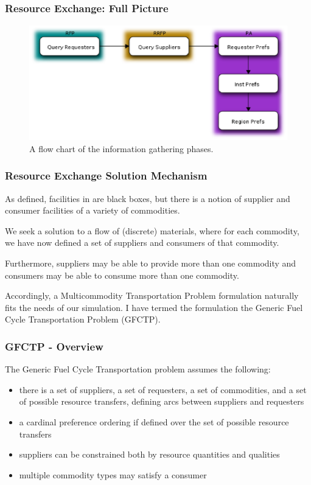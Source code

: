 \begin{frame}[ctb!]
  \frametitle{Resource Exchange: Full Picture}
  \begin{figure}
    \includegraphics[height=5cm]{./images/exchange.eps}
    \caption{A flow chart of the information gathering phases.}
  \end{figure}
\end{frame}

\begin{frame}[ctb!]
  \frametitle{Resource Exchange Solution Mechanism}
  
  As defined, facilities in \Cyclus are black boxes, but there is a notion of
  supplier and consumer facilities of a variety of commodities.\vspace{0.2cm}

  We seek a solution to a flow of (discrete) materials, where for each
  commodity, we have now defined a set of suppliers and consumers of that
  commodity.\vspace{0.2cm} 
  
  Furthermore, suppliers may be able to provide more than one commodity and
  consumers may be able to consume more than one commodity.\vspace{0.2cm}

  Accordingly, a Multicommodity Transportation Problem formulation naturally
  fits the needs of our simulation. I have termed the formulation the Generic
  Fuel Cycle Transportation Problem (GFCTP).
  
\end{frame}

\begin{frame}[ctb!]
  \frametitle{GFCTP - Overview}
  
  The Generic Fuel Cycle Transportation problem assumes the following:

  \begin{itemize}
    \item there is a set of suppliers, a set of requesters, a set of
      commodities, and a set of possible resource transfers, defining arcs
      between suppliers and requesters
    \item a cardinal preference ordering if defined over the set of possible
      resource transfers
    \item suppliers can be constrained both by resource quantities and qualities
    \item multiple commodity types may satisfy a consumer
  \end{itemize}

\end{frame}
  


